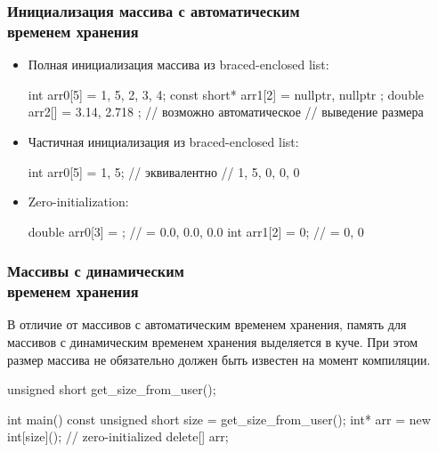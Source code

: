 \documentclass[compress, 8pt, aspectratio=169]{beamer}
\begin{document}
\begin{frame}[fragile]

    \frametitle{Инициализация массива с автоматическим \\ временем хранения}

    \begin{itemize}

        \item Полная инициализация массива из braced-enclosed list:

        \begin{myinplacelisting}[minted language=cpp]
int arr0[5] = {1, 5, 2, 3, 4};
const short* arr1[2] = { nullptr, nullptr };
double arr2[] = { 3.14, 2.718 }; // возможно автоматическое
                                 // выведение размера
        \end{myinplacelisting}

    \item Частичная инициализация из braced-enclosed list:

        \begin{myinplacelisting}[minted language=cpp]
int arr0[5] = {1, 5}; // эквивалентно
                      // {1, 5, 0, 0, 0}
        \end{myinplacelisting}

    \item Zero-initialization:

        \begin{myinplacelisting}[minted language=cpp]
double arr0[3] = {}; // = { 0.0, 0.0, 0.0 }
int arr1[2] = {0}; // = { 0, 0 }
        \end{myinplacelisting}

    \end{itemize}

\end{frame}

\begin{frame}[fragile]

    \frametitle{Массивы с динамическим \\ временем хранения}

    В отличие от массивов с автоматическим временем хранения, память для массивов
    с динамическим временем хранения выделяется в куче.
    При этом размер массива не обязательно должен быть известен на момент
    компиляции.

    \begin{myinplacelisting}[minted language=cpp]
unsigned short get_size_from_user();

int main() {
    const unsigned short size = get_size_from_user();
    int* arr = new int[size](); // zero-initialized
    delete[] arr;
}
    \end{myinplacelisting}

\end{frame}
\end{document}
